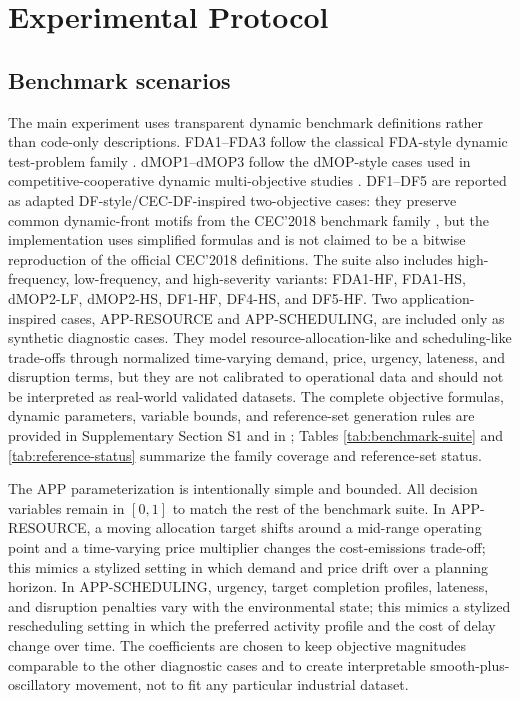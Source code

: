 \documentclass[1p,times]{elsarticle}
\begin{document}
\section{Experimental Protocol}
\subsection{Benchmark scenarios}
The main experiment uses transparent dynamic benchmark definitions rather than code-only descriptions. FDA1--FDA3 follow the classical FDA-style dynamic test-problem family \cite{farina2004}. dMOP1--dMOP3 follow the dMOP-style cases used in competitive-cooperative dynamic multi-objective studies \cite{goh2009}. DF1--DF5 are reported as adapted DF-style/CEC-DF-inspired two-objective cases: they preserve common dynamic-front motifs from the CEC'2018 benchmark family \cite{jiang2018cec}, but the implementation uses simplified formulas and is not claimed to be a bitwise reproduction of the official CEC'2018 definitions. The suite also includes high-frequency, low-frequency, and high-severity variants: FDA1-HF, FDA1-HS, dMOP2-LF, dMOP2-HS, DF1-HF, DF4-HS, and DF5-HF. Two application-inspired cases, APP-RESOURCE and APP-SCHEDULING, are included only as synthetic diagnostic cases. They model resource-allocation-like and scheduling-like trade-offs through normalized time-varying demand, price, urgency, lateness, and disruption terms, but they are not calibrated to operational data and should not be interpreted as real-world validated datasets. The complete objective formulas, dynamic parameters, variable bounds, and reference-set generation rules are provided in Supplementary Section S1 and in ; Tables \ref{tab:benchmark-suite} and \ref{tab:reference-status} summarize the family coverage and reference-set status.

The APP parameterization is intentionally simple and bounded. All decision variables remain in $[0,1]$ to match the rest of the benchmark suite. In APP-RESOURCE, a moving allocation target shifts around a mid-range operating point and a time-varying price multiplier changes the cost-emissions trade-off; this mimics a stylized setting in which demand and price drift over a planning horizon. In APP-SCHEDULING, urgency, target completion profiles, lateness, and disruption penalties vary with the environmental state; this mimics a stylized rescheduling setting in which the preferred activity profile and the cost of delay change over time. The coefficients are chosen to keep objective magnitudes comparable to the other diagnostic cases and to create interpretable smooth-plus-oscillatory movement, not to fit any particular industrial dataset.
\end{document}
